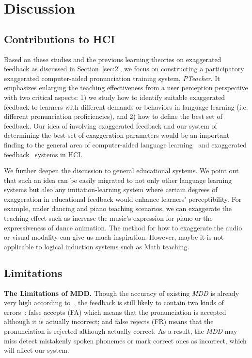 \documentclass[sigconf]{acmart}
\begin{document}
\section{Discussion}
\subsection{Contributions to HCI}
Based on these studies and the previous learning theories on exaggerated feedback as discussed in Section~\ref{sec:2}, we focus on constructing a participatory exaggerated computer-aided pronunciation training system, \textit{PTeacher}. It emphasizes enlarging the teaching effectiveness from a user perception perspective with two critical aspects: 1) we study how to identify suitable exaggerated feedback to learners with different demands or behaviors in language learning (i.e. different pronunciation proficiencies), and 2) how to define the best set of feedback. Our idea of involving exaggerated feedback and our system of determining the best set of exaggeration parameters would be an important finding to the general area of computer-aided language learning~\cite{garcia2018self, neri2008effectiveness, robertson2018designing, hailpern2009creating} and exaggerated feedback~\cite{granqvist2018exaggeration} systems in HCI.

We further deepen the discussion to general educational systems. We point out that such an idea can be easily migrated to not only other language learning systems but also any imitation-learning system where certain degrees of exaggeration in educational feedback would enhance learners’ perceptibility. For example, under dancing and piano teaching scenarios, we can exaggerate the teaching effect such as increase the music’s expression for piano or the expressiveness of dance animation. The method for how to exaggerate the audio or visual modality can give us much inspiration. However, maybe it is not applicable to logical induction systems such as Math teaching.

\subsection{Limitations}
\noindent\textbf{The Limitations of MDD.}
Though the accuracy of existing \textit{MDD} is already very high according to~\cite{li2016mispronunciation,li2015integrating,li2015rating}, the feedback is still likely to contain two kinds of errors~\cite{badin2010visual}: false accepts (FA) which means that the pronunciation is accepted although it is actually incorrect; and false rejects (FR) means that the pronunciation is rejected although actually correct. As a result, the \textit{MDD} may miss detect mistakenly spoken phonemes or mark correct ones as incorrect, which will affect our system.
\end{document}
